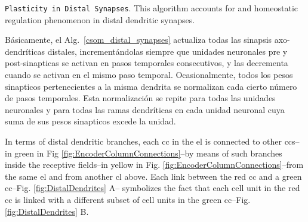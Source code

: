 {\begin{algorithm}
	\caption{\texttt{Plasticity in Distal Synapses}. This algorithm accounts for  and homeostatic regulation phenomenon in distal dendritic synapses.}
\label{csom_distal_synapses}
\begin{algorithmic}[1]
		\ENDFOR
	\ENDFOR
		\ENDFOR
	\ENDFOR
				\ENDIF
			\ENDFOR
		\ENDFOR
	\ENDIF
\end{algorithmic}
\end{algorithm}

Básicamente, el Alg.~\ref{csom_distal_synapses} actualiza todas las sinapsis axo-dendríticas distales, incrementándolas siempre que unidades neuronales pre y post-sinapticas se activan en pasos temporales consecutivos, y las decrementa cuando se activan en el mismo paso temporal. Ocasionalmente, todos los pesos sinapticos pertenecientes a la misma dendrita se normalizan cada cierto número de pasos temporales. Esta normalización se repite para todas las unidades neuronales y para todas las ramas dendríticas en cada unidad neuronal cuya suma de sus pesos sinapticos excede la unidad.
}{
In terms of distal dendritic branches, each \gls{cc} in the \gls{el} is connected to other \glspl{cc}--in green in Fig \ref{fig:EncoderColumnConnections}--by means of such
branches inside the receptive fields--in yellow in Fig. \ref{fig:EncoderColumnConnections}--from the same \gls{el} and from another \gls{cl}
above.
Each link between the red \gls{cc} and a green \gls{cc}--Fig. \ref{fig:DistalDendrites} A--
symbolizes the fact that each cell unit in
the red \gls{cc} is linked with a different subset of cell units in the green \gls{cc}--Fig. \ref{fig:DistalDendrites} B.

}
